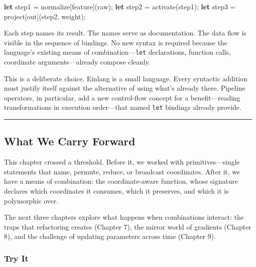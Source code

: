 \documentclass[11pt,]{article}
\newenvironment{Shaded}{}{}
\newcommand{\KeywordTok}[1]{\textcolor[rgb]{0.00,0.44,0.13}{\textbf{#1}}}
\newcommand{\NormalTok}[1]{#1}
\newcommand{\OperatorTok}[1]{\textcolor[rgb]{0.40,0.40,0.40}{#1}}
\begin{document}
\begin{Shaded}
\begin{Highlighting}[]
\KeywordTok{let}\NormalTok{ step1 = normalize}\OperatorTok{[}\NormalTok{feature}\OperatorTok{]}\NormalTok{(raw);}
\KeywordTok{let}\NormalTok{ step2 = activate(step1);}
\KeywordTok{let}\NormalTok{ step3 = project}\OperatorTok{[}\NormalTok{out}\OperatorTok{]}\NormalTok{(step2, weight);}
\end{Highlighting}
\end{Shaded}

Each step names its result. The names serve as documentation. The data
flow is visible in the sequence of bindings. No new syntax is required
because the language's existing means of combination---\texttt{let}
declarations, function calls, coordinate arguments---already compose
cleanly.

This is a deliberate choice. Einlang is a small language. Every
syntactic addition must justify itself against the alternative of using
what's already there. Pipeline operators, in particular, add a new
control-flow concept for a benefit---reading transformations in
execution order---that named \texttt{let} bindings already provide.

\begin{center}\rule{0.5\linewidth}{0.4pt}\end{center}

\hypertarget{what-we-carry-forward}{%
\subsection{What We Carry Forward}\label{what-we-carry-forward}}

This chapter crossed a threshold. Before it, we worked with
primitives---single statements that name, permute, reduce, or broadcast
coordinates. After it, we have a means of combination: the
coordinate-aware function, whose signature declares which coordinates it
consumes, which it preserves, and which it is polymorphic over.

The next three chapters explore what happens when combinations interact:
the traps that refactoring creates (Chapter 7), the mirror world of
gradients (Chapter 8), and the challenge of updating parameters across
time (Chapter 9).

\hypertarget{try-it-5}{%
\subsubsection{Try It}\label{try-it-5}}
\end{document}
